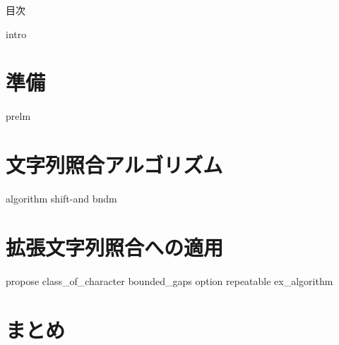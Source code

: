 \documentclass[12pt, dvipdfmx]{beamer}
\begin{document}
\maketitle
\begin{frame}{目次}
	\tableofcontents
\end{frame}

{intro}
\section{準備}
{prelm}
\section{文字列照合アルゴリズム}
{algorithm}
{shift-and}
{bndm}
\section{拡張文字列照合への適用}
{propose}
{class_of_character}
{bounded_gaps}
{option}
{repeatable}
{ex_algorithm}
\section{まとめ}
\end{document}
